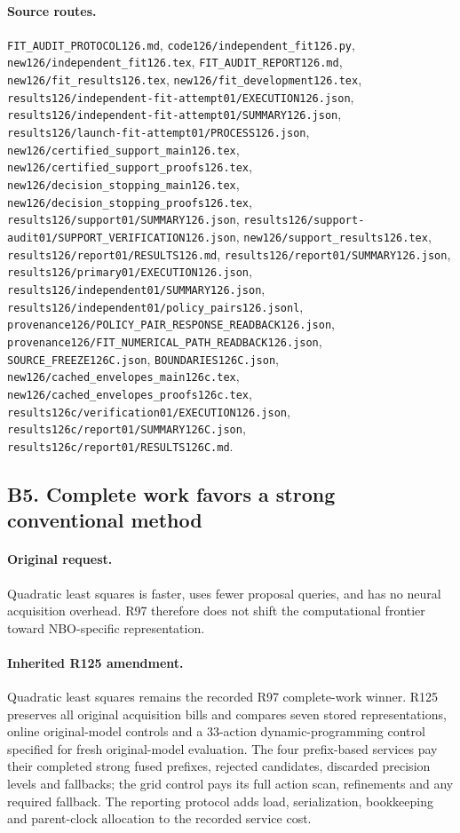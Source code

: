 \paragraph{Source routes.} \nolinkurl{FIT_AUDIT_PROTOCOL126.md}, \nolinkurl{code126/independent_fit126.py}, \nolinkurl{new126/independent_fit126.tex}, \nolinkurl{FIT_AUDIT_REPORT126.md}, \nolinkurl{new126/fit_results126.tex}, \nolinkurl{new126/fit_development126.tex}, \nolinkurl{results126/independent-fit-attempt01/EXECUTION126.json}, \nolinkurl{results126/independent-fit-attempt01/SUMMARY126.json}, \nolinkurl{results126/launch-fit-attempt01/PROCESS126.json}, \nolinkurl{new126/certified_support_main126.tex}, \nolinkurl{new126/certified_support_proofs126.tex}, \nolinkurl{new126/decision_stopping_main126.tex}, \nolinkurl{new126/decision_stopping_proofs126.tex}, \nolinkurl{results126/support01/SUMMARY126.json}, \nolinkurl{results126/support-audit01/SUPPORT_VERIFICATION126.json}, \nolinkurl{new126/support_results126.tex}, \nolinkurl{results126/report01/RESULTS126.md}, \nolinkurl{results126/report01/SUMMARY126.json}, \nolinkurl{results126/primary01/EXECUTION126.json}, \nolinkurl{results126/independent01/SUMMARY126.json}, \nolinkurl{results126/independent01/policy_pairs126.jsonl}, \nolinkurl{provenance126/POLICY_PAIR_RESPONSE_READBACK126.json}, \nolinkurl{provenance126/FIT_NUMERICAL_PATH_READBACK126.json}, \nolinkurl{SOURCE_FREEZE126C.json}, \nolinkurl{BOUNDARIES126C.json}, \nolinkurl{new126/cached_envelopes_main126c.tex}, \nolinkurl{new126/cached_envelopes_proofs126c.tex}, \nolinkurl{results126c/verification01/EXECUTION126.json}, \nolinkurl{results126c/report01/SUMMARY126C.json}, \nolinkurl{results126c/report01/RESULTS126C.md}.

\subsection*{B5. Complete work favors a strong conventional method}
\paragraph{Original request.} Quadratic least squares is faster, uses fewer proposal queries, and has no neural acquisition overhead. R97 therefore does not shift the computational frontier toward NBO-specific representation.

\paragraph{Inherited R125 amendment.} Quadratic least squares remains the recorded R97 complete-work winner. R125 preserves all original acquisition bills and compares seven stored representations, online original-model controls and a 33-action dynamic-programming control specified for fresh original-model evaluation. The four prefix-based services pay their completed strong fused prefixes, rejected candidates, discarded precision levels and fallbacks; the grid control pays its full action scan, refinements and any required fallback. The reporting protocol adds load, serialization, bookkeeping and parent-clock allocation to the recorded service cost.

